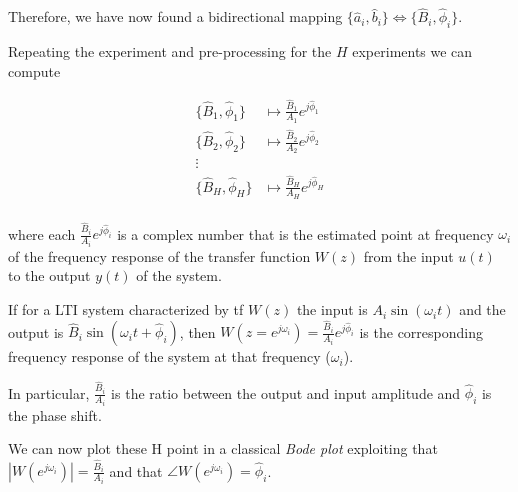 Therefore, we have now found a bidirectional mapping $ \{ \hat{a}_i, \hat{b}_i \} \iff \{ \hat{B}_i, \hat{\phi}_i \}$.

Repeating the experiment and pre-processing for the $H$ experiments we can compute 

\begin{align*}
    \{ \hat{B}_1, \hat{\phi}_1 \} &\mapsto \frac{\hat{B}_1}{A_1} e^{j\hat{\phi}_1} \\
    \{ \hat{B}_2, \hat{\phi}_2 \} &\mapsto \frac{\hat{B}_2}{A_2} e^{j\hat{\phi}_2} \\
    \vdots& \\
    \{ \hat{B}_H, \hat{\phi}_H \} &\mapsto \frac{\hat{B}_H}{A_H} e^{j\hat{\phi}_H} \\
\end{align*}

where each $\frac{\hat{B}_i}{A_i} e^{j\hat{\phi}_i}$ is a complex number that is the estimated point at frequency $\omega_i$ of the frequency response of the transfer function $W(z)$ from the input $u(t)$ to the output $y(t)$ of the system.

\begin{recall}
    If for a LTI system characterized by \gls{tf} $W(z)$ the input is $A_i \sin (\omega_i t)$ and the output is $\hat{B}_i \sin (\omega_i t + \hat{\phi}_i)$, then $W(z=e^{j \omega_i}) = \frac{\hat{B}_i}{A_i} e^{j\hat{\phi}_i}$ is the corresponding frequency response of the system at that frequency ($\omega_i$).
    
    In particular, $\frac{\hat{B}_i}{A_i}$ is the ratio between the output and input amplitude and $\hat{\phi}_i$ is the phase shift.
\end{recall}

We can now plot these H point in a classical \emph{Bode plot} exploiting that $|W(e^{j \omega_i})| = \frac{\hat{B}_i}{A_i}$ and that $\angle W(e^{j \omega_i}) = \hat{\phi}_i$.

\begin{figure}[H]
    \centering
\end{figure}

